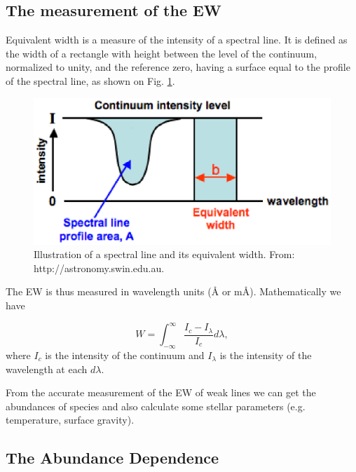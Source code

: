 \documentclass[dvips,12pt,a4paper]{report}
\begin{document}
{\subsection{The measurement of the EW}

Equivalent width is a measure of the intensity of a spectral line. It is defined as the width of a rectangle with height between the level of the continuum, normalized to unity, and the reference zero, having a surface equal to the profile of the spectral line, as shown on Fig. \ref{ew}. 

\begin{figure}[h]
\centering
\includegraphics[height=5 cm]{pics/equivalent_width}
\caption{Illustration of a spectral line and its equivalent width. From: http://astronomy.swin.edu.au.}
\label{ew}
\end{figure}

The EW is thus measured in wavelength units (\AA{}  or m\AA). Mathematically we have

\begin{equation}
 W=\int_{-\infty}^{\infty} \frac{I_c-I_\lambda}{I_c}d\lambda,
\end{equation}
where $I_c$ is the intensity of the continuum and $I_\lambda$ is the intensity of the wavelength at each $d\lambda$.

From the accurate measurement of the EW of weak lines we can get the abundances of species and also calculate some stellar parameters (e.g. temperature, surface gravity).

\subsection{The Abundance Dependence}
\label{abdep}

}
\end{document}
